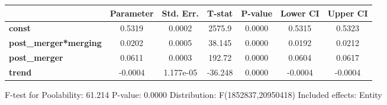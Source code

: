 \documentclass{report}
\begin{document}
\begin{center}
\begin{tabular}{lcccccc}
                              & \textbf{Parameter} & \textbf{Std. Err.} & \textbf{T-stat} & \textbf{P-value} & \textbf{Lower CI} & \textbf{Upper CI}  \\
\midrule
\textbf{const}                &       0.5319       &       0.0002       &      2575.9     &      0.0000      &       0.5315      &       0.5323       \\
\textbf{post\_merger*merging} &       0.0202       &       0.0005       &      38.145     &      0.0000      &       0.0192      &       0.0212       \\
\textbf{post\_merger}         &       0.0611       &       0.0003       &      192.72     &      0.0000      &       0.0604      &       0.0617       \\
\textbf{trend}                &      -0.0004       &     1.177e-05      &     -36.248     &      0.0000      &      -0.0004      &      -0.0004       \\
\bottomrule
\end{tabular}
\end{center}

F-test for Poolability: 61.214 \newline
 P-value: 0.0000 \newline
 Distribution: F(1852837,20950418) \newline
  \newline
 Included effects: Entity
\end{document}
